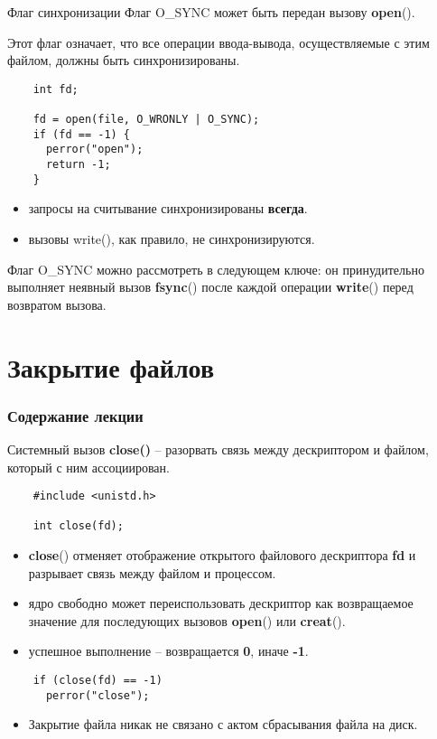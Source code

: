 \documentclass[xcolor=table]{beamer}
\begin{document}
\begin{frame}[fragile]{Флаг синхронизации}
	Флаг O\_SYNC может быть передан вызову \textbf{open}(). 
	
	Этот флаг означает, что все операции ввода-­вывода, осуществляемые с этим файлом, должны быть синхронизированы.

	\begin{verbatim}
	int fd;

	fd = open(file, O_WRONLY | O_SYNC);	
	if (fd == -1) {
	  perror("open");
	  return -1;
	}
	\end{verbatim}

	\begin{itemize}
		\item запросы на считывание синхронизированы \textbf{всегда}. 
		\item вызовы write(), как правило, не синхронизируются.
	\end{itemize}
	
	Флаг O\_SYNC можно рассмотреть в следующем ключе: он принудительно выполняет неявный вызов \textbf{fsync}() после каждой операции \textbf{write}() перед возвратом вызова. 
\end{frame}

\section{Закрытие файлов}
\begin{frame}
  \frametitle{Содержание лекции}
  \tableofcontents[current]
\end{frame}

\begin{frame}[fragile]
	Системный вызов \textbf{close()} -- разорвать связь между дескриптором и файлом, который с ним ассоциирован.
	\begin{verbatim}
	#include <unistd.h>

	int close(fd);
	\end{verbatim}
	\begin{itemize}
		\item \textbf{close}() отменяет отображение открытого файлового дескриптора \textbf{fd} и разрывает связь между файлом и процессом. 
		\item ядро свободно может переиспользовать дескриптор как возвращаемое значение для последующих вызовов \textbf{open}() или \textbf{creat}(). 
		\item успешное выполнение -- возвращается \textbf{0}, иначе \textbf{-1}. 
	\end{itemize}
	\begin{verbatim}
	if (close(fd) == -1)
	  perror("close");
	\end{verbatim}
	\begin{itemize}
		\item Закрытие файла никак не связано с актом сбрасывания файла на диск. 
	\end{itemize}
\end{frame}
\end{document}
